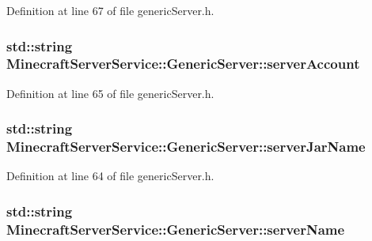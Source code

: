 Definition at line 67 of file generic\+Server.\+h.

\subsubsection[{\texorpdfstring{server\+Account}{serverAccount}}]{\setlength{\rightskip}{0pt plus 5cm}std\+::string Minecraft\+Server\+Service\+::\+Generic\+Server\+::server\+Account\hspace{0.3cm}{\ttfamily [protected]}}\hypertarget{class_minecraft_server_service_1_1_generic_server_a0192c45acc976639f38aa7206586abcf}{}\label{class_minecraft_server_service_1_1_generic_server_a0192c45acc976639f38aa7206586abcf}


Definition at line 65 of file generic\+Server.\+h.

\subsubsection[{\texorpdfstring{server\+Jar\+Name}{serverJarName}}]{\setlength{\rightskip}{0pt plus 5cm}std\+::string Minecraft\+Server\+Service\+::\+Generic\+Server\+::server\+Jar\+Name\hspace{0.3cm}{\ttfamily [protected]}}\hypertarget{class_minecraft_server_service_1_1_generic_server_add9023bc7c35b390e67507493449f7a5}{}\label{class_minecraft_server_service_1_1_generic_server_add9023bc7c35b390e67507493449f7a5}


Definition at line 64 of file generic\+Server.\+h.

\subsubsection[{\texorpdfstring{server\+Name}{serverName}}]{\setlength{\rightskip}{0pt plus 5cm}std\+::string Minecraft\+Server\+Service\+::\+Generic\+Server\+::server\+Name}\hypertarget{class_minecraft_server_service_1_1_generic_server_a5586cb49baa6e827fd2d755dfa3b5c5d}{}\label{class_minecraft_server_service_1_1_generic_server_a5586cb49baa6e827fd2d755dfa3b5c5d}


